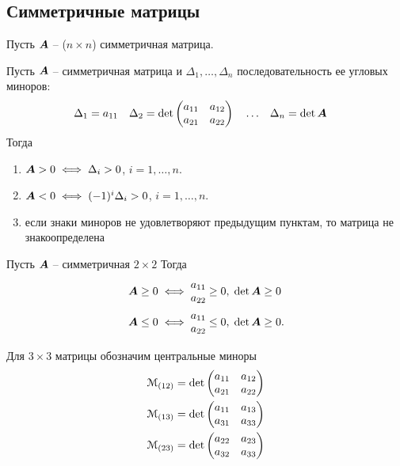 
\subsection{Симметричные матрицы}

Пусть \({\bm A}\) -- (\(n\times n\)) симметричная матрица.

\begin{teorema}\label{SylvesterCiterion}
Пусть ${\bm A}$ -- симметричная матрица и
$\Delta_1,\ldots,\Delta_n$ последовательность ее угловых миноров:
\begin{align*}
	\Delta_1&=a_{11} & \Delta_2&=\det\begin{pmatrix} a_{11} & a_{12} \\ a_{21} & a_{22} \end{pmatrix} & 
	&\ldots & \Delta_n&=\det{\bm A}
\end{align*}
Тогда
\begin{enumerate}
	\item ${\bm A}>0\iff\Delta_i>0$, $i=1,\ldots,n$.
	\item ${\bm A}<0\iff(-1)^i\Delta_i>0$, $i=1,\ldots,n$.
	\item если знаки миноров не удовлетворяют предыдущим пунктам, 
	то матрица не знакоопределена
\end{enumerate}  
\end{teorema}

\begin{propuesta}\label{2times2definitness}
Пусть ${\bm A}$ -- симметричная $2\times 2$ 
Тогда
\begin{align*}
	{\bm A}\geq0 &\iff \begin{matrix} a_{11} \\ a_{22} \end{matrix} \geq0,\;\det{\bm A}\geq0\\
	{\bm A}\leq0  &\iff \begin{matrix} a_{11} \\ a_{22} \end{matrix} \leq0,\;\det{\bm A}\geq0.
\end{align*}    
\end{propuesta}

Для  $3\times3$ матрицы обозначим центральные миноры 
\begin{align*}
	{\mathcal M}_{(12)}&=\det\begin{pmatrix} a_{11} & a_{12} \\ a_{21} & a_{22} \end{pmatrix} \\
	{\mathcal M}_{(13)}&=\det\begin{pmatrix} a_{11} & a_{13} \\ a_{31} & a_{33} \end{pmatrix} \\
	{\mathcal M}_{(23)}&=\det\begin{pmatrix} a_{22} & a_{23} \\ a_{32} & a_{33} \end{pmatrix} 
\end{align*}

